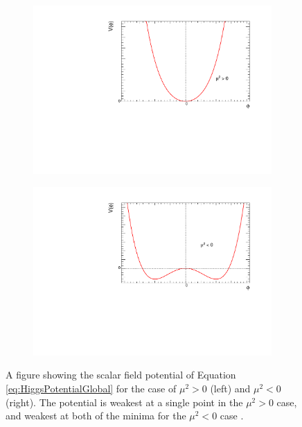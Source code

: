 \documentclass[12pt,a4paper,epsf,portrait,times,epsfig]{report}
\begin{document}
	\begin{figure}[ht]
		\begin{subfigure}{.48\textwidth}
			\centering
			\includegraphics[scale=0.38]{HiggsPot_muEven.pdf}
			\label{Fig:HiggsPot_muEven}
		\end{subfigure}
		\begin{subfigure}{.48\textwidth}
			\centering
			\includegraphics[scale=0.38]{HiggsPot_muOdd.pdf}
			\label{Fig:HiggsPot_muOdd}
		\end{subfigure}
		\caption{A figure showing the scalar field potential of Equation \ref{eq:HiggsPotentialGlobal} for the case of $\mu^2 > 0$ (left) and $\mu^2 < 0$ (right). The potential is weakest at a single point in the $\mu^{2} > 0$ case, and weakest at both of the minima for the $\mu^{2} < 0$ case \cite{AntonyFrayThesis}.}
		\label{Fig:HiggsPotential2D} 
	\end{figure}
\end{document}
